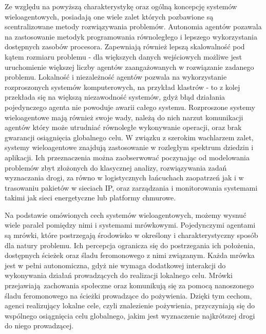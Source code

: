 {    Ze względu na powyższą charakterystykę oraz ogólną koncepcję systemów wieloagentowych, posiadają one wiele zalet
    których pozbawione są scentralizowane metody rozwiązywania problemów. Autonomia agentów pozawala na zastosowanie
    metodyk programowania równoległego i lepszego wykorzystania dostępnych zasobów procesora. Zapewniają również lepszą
    skalowalność pod kątem rozmiaru problemu - dla większych danych wejściowych możliwe jest uruchomienie większej
    liczby agentów zaangażowanych w rozwiązanie zadanego problemu. Lokalność i niezależność agentów pozwala na
    wykorzystanie rozproszonych systemów komputerowych, na przykład klastrów - to z kolej przekłada się na większą
    niezawodność systemów, gdyż błąd działania pojedynczego agenta nie powoduje awarii całego systemu. Rozproszone
    systemy wieloagentowe mają również swoje wady, należą do nich narzut komunikacji agentów który może utrudniać
    równoległe wykonywanie operacji, oraz brak gwarancji osiągnięcia globalnego celu\cite{Dorri2018MultiAgentSA, Balaji2010AnIT}.
    W związku z szerokim wachlarzem zalet, systemy wieloagentowe znajdują zastosowanie w rozległym spektrum dziedzin i
    aplikacji. Ich przeznaczenia można zaobserwować poczynając od modelowania problemów zbyt złożonych do klasycznej
    analizy, rozwiązywania zadań wyznaczania drogi, za równo w logistycznych łańcuchach zaopatrzeń jak i w trasowaniu
    pakietów w sieciach IP, oraz zarządzania i monitorowania systemami takimi jak sieci energetyczne lub platformy
    chmurowe\cite{Dorri2018MultiAgentSA, Oprea2004ApplicationsOM}.


    Na podstawie omówionych cech systemów wieloagentowych, możemy wysnuć wiele paralel pomiędzy nimi i systemami
    mrówkowymi. Pojedynczymi agentami są mrówki, które postrzegają środowisko w określony i charakterystyczny sposób dla
    natury problemu. Ich percepcja ogranicza się do postrzegania ich położenia, dostępnych ścieżek oraz śladu
    feromonowego z nimi związanym. Każda mrówka jest w pełni autonomiczna, gdyż nie wymaga dodatkowej interakcji do
    wykonywania działań prowadzących do realizacji lokalnego celu. Mrówki przejawiają zachowania społeczne oraz
    komunikują się za pomocą nanoszonego śladu feromonowego na ścieżki prowadzące do pożywienia. Dzięki tym cechom,
    agenci realizujący lokalne cele, czyli znalezienie pożywienia, przyczyniają się do wspólnego osiągnięcia celu
    globalnego, jakim jest wyznaczenie najkrótszej drogi do niego prowadzącej.


}
